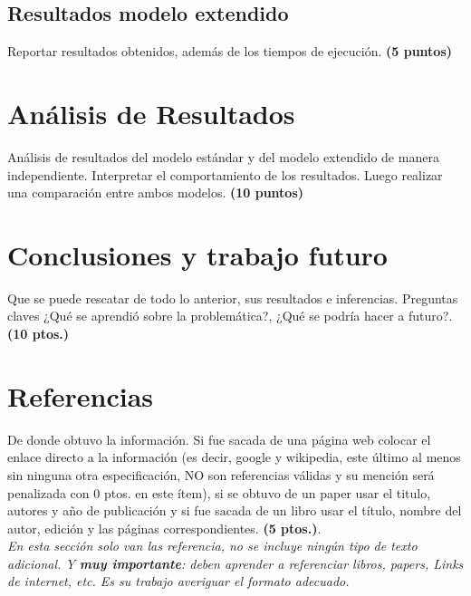 \documentclass[journal, 10pt]{IEEEtran}
\begin{document}
\subsection{Resultados modelo extendido}
Reportar resultados obtenidos, además de los tiempos de ejecución. \textbf{(5 puntos)}

\section{Análisis de Resultados}
Análisis de resultados del modelo estándar y del modelo extendido de manera independiente. Interpretar el comportamiento de los resultados. Luego realizar una comparación entre ambos modelos. \textbf{(10 puntos)}

\section{Conclusiones y trabajo futuro}

Que se puede rescatar de todo lo anterior, sus resultados e inferencias. Preguntas claves ¿Qué se aprendió sobre la problemática?, ¿Qué se podría hacer a futuro?. \textbf{(10 ptos.)}

\section{Referencias}

De donde obtuvo la información. Si fue sacada de una página web colocar el enlace directo a la información (es decir, google y wikipedia, este último al menos sin ninguna otra especificación, NO son referencias válidas y su mención será penalizada con 0 ptos. en este ítem), si se obtuvo de un paper usar el titulo, autores y año de publicación y si fue sacada de un libro usar el título, nombre del autor, edición y las páginas correspondientes. \textbf{(5 ptos.)}.\\

\textit{En esta sección solo van las referencia, no se incluye ningún tipo de texto adicional. Y \textbf{muy importante}: deben aprender a referenciar libros, papers, Links de internet, etc. Es su trabajo averiguar el formato adecuado.}




\end{document}
